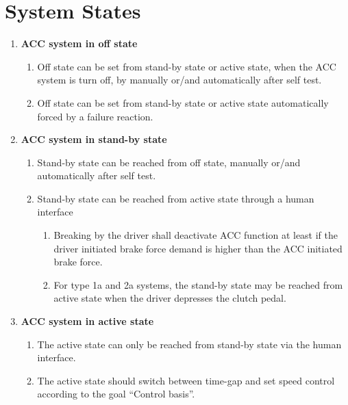 
\section{System States}
	\begin{enumerate}
		\item {\bf ACC system in off state}
			\begin{enumerate}[label*=\arabic*.]
				\item Off state can be set from stand-by state or active state, when 
				the ACC system is turn off, by manually or/and automatically after self test.
				\item Off state can be set from stand-by state or active state automatically
				forced by a failure reaction.
			\end{enumerate}
		\item {\bf ACC system in stand-by state}
			\begin{enumerate}[label*=\arabic*.]
				\item Stand-by state can be reached from off state, manually or/and 
				automatically after self test.
				\item Stand-by state can be reached from active state through a human 
				interface
					\begin{enumerate}[label*=\arabic*.]
						\item Breaking by the driver shall deactivate ACC function at least 
						if the driver initiated brake force demand is higher than the ACC 
						initiated brake force.
						\item For type 1a and 2a systems, the stand-by state may be reached
						from active state when the driver depresses the clutch pedal.
					\end{enumerate}
			\end{enumerate}
		\item {\bf ACC system in active state}
			\begin{enumerate}[label*=\arabic*.]
				\item The active state can only be reached from stand-by state via the human
				interface. 
				\item The active state should switch between time-gap and set speed control
				according to the goal “Control basis”.
			\end{enumerate}
	\end{enumerate}

\clearpage

